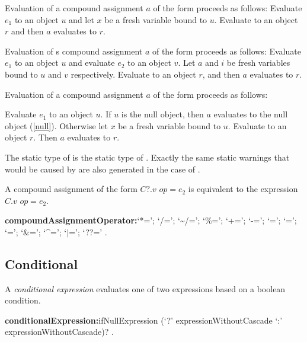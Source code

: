 \documentclass{article}
\begin{document}
\LMHash{}
Evaluation of a compound assignment $a$ of the form  proceeds as follows:
Evaluate $e_1$ to an object $u$ and let $x$ be a fresh variable bound to $u$.
Evaluate  to an object $r$
and then $a$ evaluates to $r$.

\LMHash{}
Evaluation of s compound assignment $a$ of the form  proceeds as follows:
Evaluate $e_1$ to an object $u$ and evaluate $e_2$ to an object $v$.
Let $a$ and $i$ be fresh variables bound to $u$ and $v$ respectively.
Evaluate  to an object $r$,
and then $a$ evaluates to $r$.

\LMHash{}
Evaluation of a compound assignment $a$ of the form  proceeds as follows:

\LMHash{}
Evaluate $e_1$ to an object $u$.
If $u$ is the null object, then $a$ evaluates to the null object (\ref{null}).
Otherwise let $x$ be a fresh variable bound to $u$.
Evaluate  to an object $r$.
Then $a$ evaluates to $r$.

\LMHash{}
The static type of  is the static type of .
Exactly the same static warnings that would be caused by  are also generated in the case of .

\LMHash{}
A compound assignment of the form $C?.v$ $op = e_2$ is equivalent to the expression
$C.v$ $op = e_2$.

\begin{grammar}
{\bf compoundAssignmentOperator:}`*=';
  `/=';
  `\~{}/=';
  `\%=';
  `+=';
  `-=';
  `{\escapegrammar \lt \lt}=';
  `{\escapegrammar \gt \gt}=';
  `{\escapegrammar \gt \gt \gt}=';
  `\&=';
  `\^{}=';
  `$|$=';
  `??='
  .
\end{grammar}


\subsection{Conditional}

\LMHash{}
A {\em conditional expression} evaluates one of two expressions based on a boolean condition.

\begin{grammar}
{\bf conditionalExpression:}ifNullExpression
  \gnewline{} (`?' expressionWithoutCascade `{\escapegrammar :}' expressionWithoutCascade)?
  .
\end{grammar}
\end{document}
